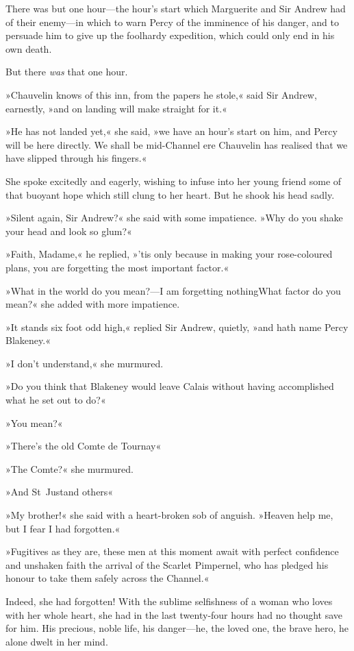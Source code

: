 There was but one hour—the hour's start which Marguerite and Sir Andrew had of their enemy—in which to warn Percy of the imminence of his danger, and to persuade him to give up the foolhardy expedition, which could only end in his own death.

But there \textit{was} that one hour.

»Chauvelin knows of this inn, from the papers he stole,« said Sir Andrew, earnestly, »and on landing will make straight for it.«

»He has not landed yet,« she said, »we have an hour's start on him, and Percy will be here directly. We shall be mid-Channel ere Chauvelin has realised that we have slipped through his fingers.«

She spoke excitedly and eagerly, wishing to infuse into her young friend some of that buoyant hope which still clung to her heart. But he shook his head sadly.

»Silent again, Sir Andrew?« she said with some impatience. »Why do you shake your head and look so glum?«

»Faith, Madame,« he replied, »'tis only because in making your rose-coloured plans, you are forgetting the most important factor.«

»What in the world do you mean?—I am forgetting nothing\textellipsis \allowbreak  What factor do you mean?« she added with more impatience.

»It stands six foot odd high,« replied Sir Andrew, quietly, »and hath name Percy Blakeney.«

»I don't understand,« she murmured.

»Do you think that Blakeney would leave Calais without having accomplished what he set out to do?«

»You mean\textellipsis \allowbreak  ?«

»There's the old Comte de Tournay\textellipsis«

»The Comte\textellipsis \allowbreak  ?« she murmured.

»And St~Just\textellipsis \allowbreak  and others\textellipsis«

»My brother!« she said with a heart-broken sob of anguish. »Heaven help me, but I fear I had forgotten.«

»Fugitives as they are, these men at this moment await with perfect confidence and unshaken faith the arrival of the Scarlet Pimpernel, who has pledged his honour to take them safely across the Channel.«

Indeed, she had forgotten! With the sublime selfishness of a woman who loves with her whole heart, she had in the last twenty-four hours had no thought save for him. His precious, noble life, his danger—he, the loved one, the brave hero, he alone dwelt in her mind.

